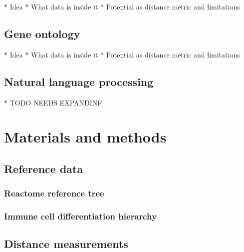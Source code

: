 \documentclass{thesisclass}
\begin{document}
* Idea
* What data is inside it
* Potential as distance metric and limitations

\section{Gene ontology}

* Idea
* What data is inside it
* Potential as distance metric and limitations

%
%
%

\section{Natural language processing}

* TODO NEEDS EXPANDINF

\chapter{Materials and methods} \label{ch:methods}

\section{Reference data}

\subsection{Reactome reference tree}

\subsection{Immune cell differentiation hierarchy}

\section{Distance measurements}
\end{document}
